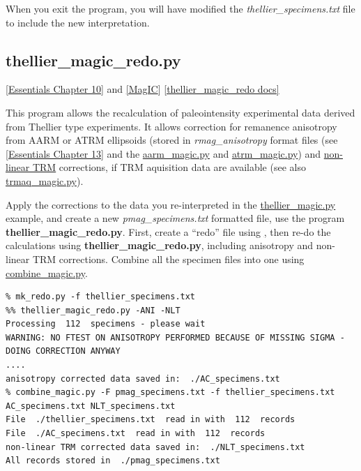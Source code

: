 \documentclass[11pt]{book}
\begin{document}
{When you exit the program, you will have modified the {\it thellier\_specimens.txt} file to include the new interpretation.



\subsection{thellier\_magic\_redo.py}
\href{http://earthref.org/MAGIC/books/Tauxe/Essentials/WebBook3ch10.html#ch10}{[Essentials Chapter 10]} and \href{#MagIC}{[MagIC}]
\href{https://github.com/PmagPy/PmagPy/blob/master/programs/thellier_magic_redo.py}{[thellier\_magic\_redo docs]}

This program allows the recalculation of paleointensity experimental data derived from Thellier type experiments.  It allows correction for remanence  anisotropy from AARM or ATRM ellipsoids (stored in {\it rmag\_anisotropy} format files (see \href{http://earthref.org/MAGIC/books/Tauxe/Essentials/WebBook3ch13.html#ch13}{[Essentials Chapter 13]} and the \href{#aarm_magic.py}{aarm\_magic.py} and \href{#atrm_magic.py}{atrm\_magic.py}) and \href{http://earthref.org/MAGIC/books/Tauxe/Essentials/WebBook3ch10.html#non-linear_TRM}{non-linear TRM} corrections, if TRM aquisition data are available (see also \href{#trmaq_magic.py}{trmaq\_magic.py}).


Apply the corrections to the  data you re-interpreted in the \href{#thellier_magic.py}{thellier\_magic.py} example,   and create a new {\it pmag\_specimens.txt} formatted file, use the program {\bf thellier\_magic\_redo.py}.   First, create a ``redo'' file using \href{#mk_redo.py}, then re-do the calculations using {\bf thellier\_magic\_redo.py}, including anisotropy and non-linear TRM corrections.    Combine all the specimen files into one using \href{#combine_magic.py}{combine\_magic.py}.

\begin{verbatim}
% mk_redo.py -f thellier_specimens.txt
%% thellier_magic_redo.py -ANI -NLT
Processing  112  specimens - please wait
WARNING: NO FTEST ON ANISOTROPY PERFORMED BECAUSE OF MISSING SIGMA - DOING CORRECTION ANYWAY
....
anisotropy corrected data saved in:  ./AC_specimens.txt
% combine_magic.py -F pmag_specimens.txt -f thellier_specimens.txt AC_specimens.txt NLT_specimens.txt
File  ./thellier_specimens.txt  read in with  112  records
File  ./AC_specimens.txt  read in with  112  records
non-linear TRM corrected data saved in:  ./NLT_specimens.txt
All records stored in  ./pmag_specimens.txt
\end{verbatim}

}
\end{document}
